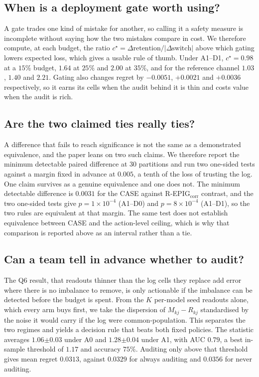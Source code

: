 \documentclass{article}
\theoremstyle{plain}
\theoremstyle{remark}
\newcommand{\se}[1]{{\scriptstyle\pm#1}}
\begin{document}
\subsection{When is a deployment gate worth using?}
A gate trades one kind of mistake for another, so calling it a safety measure is incomplete without
saying how the two mistakes compare in cost. We therefore compute, at each budget, the ratio
$c^\star=\Delta\text{retention}/|\Delta\text{switch}|$ above which gating lowers expected loss, which
gives a usable rule of thumb. Under A1--D1, $c^\star=0.98$ at a $15\%$
budget, $1.64$ at $25\%$ and $2.00$ at $35\%$, and for the reference channel $1.03$, $1.40$ and
$2.21$. Gating also changes regret by $-0.0051$, $+0.0021$ and $+0.0036$ respectively, so it earns
its cells when the audit behind it is thin and costs value when the audit is rich.

\subsection{Are the two claimed ties really ties?}
A difference that fails to reach significance is not the same as a demonstrated equivalence, and the
paper leans on two such claims. We therefore report the minimum detectable paired difference at $30$
partitions and run two one-sided tests against a margin fixed in advance at $0.005$, a tenth of the
loss of trusting the log. One claim survives as a genuine equivalence and one does not. The minimum
detectable difference is $0.0031$ for the CASE against
R-EPIG$_{\mathrm{corr}}$ contrast, and the two one-sided tests give $p=1\times10^{-4}$ (A1--D0) and
$p=8\times10^{-4}$ (A1--D1), so the two rules are equivalent at that margin. The same test does not
establish equivalence between CASE and the action-level ceiling, which is why that comparison is
reported above as an interval rather than a tie.

\subsection{Can a team tell in advance whether to audit?}
The Q6 result, that readouts thinner than the log cells they replace add error where there is no
imbalance to remove, is only actionable if the imbalance can be detected before the budget is spent. From the $K$ per-model seed readouts alone, which every arm buys
first, we take the dispersion of $M_{kj}-R_{kj}$ standardised by the noise it would carry if the log
were common-population. This separates the two regimes and yields a decision rule that beats both
fixed policies. The statistic averages $1.06\se{0.03}$ under A0 and
$1.28\se{0.04}$ under A1, with AUC $0.79$, a best in-sample threshold of $1.17$ and accuracy $75\%$.
Auditing only above that threshold gives mean regret $0.0313$, against $0.0329$ for always auditing
and $0.0356$ for never auditing.
\end{document}
